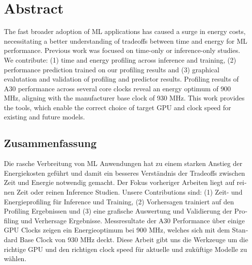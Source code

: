 \begingroup
\let\clearpage\relax
\let\cleardoublepage\relax
\let\cleardoublepage\relax


\chapter*{Abstract}




The fast broader adoption of ML applications has caused a surge in energy costs, necessitating a better understanding of tradeoffs between time and energy for ML performance. Previous work was focused on time-only or inference-only studies. We contribute: (1) time and energy profiling across inference and training, (2) performance prediction trained on our profiling results and (3) graphical evalutation and validation of profiling and predictor results. Profiling results of A30 performance across several core clocks reveal an energy optimum of 900 MHz, aligning with the manufacturer base clock of 930 MHz. This work provides the tools, which enable the correct choice of target GPU and clock speed for existing and future models.


\newpage


\begin{otherlanguage}{ngerman}
\chapter*{Zusammenfassung}

Die rasche Verbreitung von ML Anwendungen hat zu einem starken Anstieg der Energiekosten geführt und damit ein besseres Verständnis der 
Tradeoffs zwischen Zeit und Energie notwendig gemacht. Der Fokus vorheriger Arbeiten liegt auf reinen Zeit oder reinen Inference Studien. Unsere Contributions sind: (1) Zeit- und Energieprofiling für Inference und Training, (2) Vorhersagen trainiert auf den Profiling Ergebnissen und (3) eine grafische Auswertung und Validierung der Profiling und Verhersage Ergebnisse. Messresultate der A30 Performance über einige GPU Clocks zeigen ein Energieoptimum bei 900 MHz, welches sich mit dem Standard Base Clock von 930 MHz deckt. Diese Arbeit gibt uns die Werkzeuge um die richtige GPU und den richtigen clock speed für aktuelle und zuküftige Modelle zu wählen.
\end{otherlanguage}

\endgroup

\vfill
